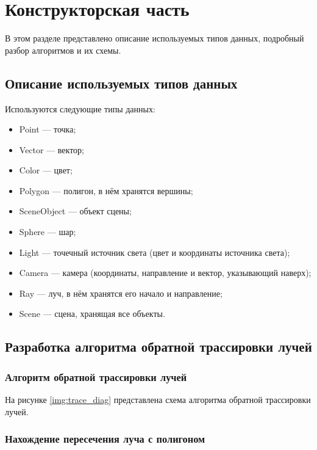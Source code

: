 \chapter{Конструкторская часть}
В этом разделе представлено описание используемых типов данных, подробный разбор алгоритмов и их схемы.


\section{Описание используемых типов данных}

Используются следующие типы данных:

\begin{itemize}[label=---]
	\item Point --- точка;
	\item Vector --- вектор;
	\item Color --- цвет;
	\item Polygon --- полигон, в нём хранятся вершины;
	\item SceneObject --- объект сцены;
	\item Sphere --- шар;
	\item Light --- точечный источник света (цвет и координаты источника света);
	\item Camera --- камера (координаты, направление и вектор, указывающий наверх);
	\item Ray --- луч, в нём хранятся его начало и направление;
	\item Scene --- сцена, хранящая все объекты.
\end{itemize}

\section{Разработка алгоритма обратной трассировки лучей}

\subsection{Алгоритм обратной трассировки лучей}
На рисунке \ref{img:trace_diag} представлена схема алгоритма обратной трассировки лучей.

\clearpage


\subsection{Нахождение пересечения луча с полигоном}

